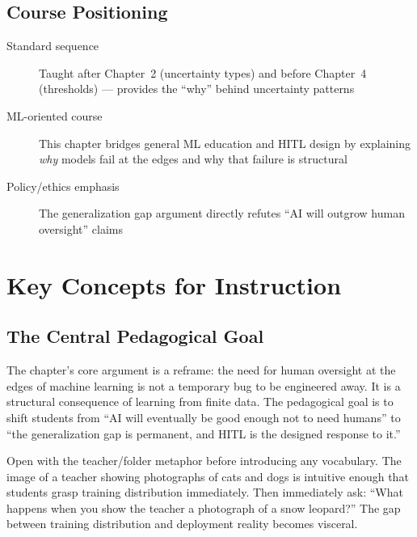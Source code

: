 \subsection{Course Positioning}

\begin{description}
    \item[Standard sequence] Taught after Chapter~2 (uncertainty types) and before Chapter~4 (thresholds) --- provides the ``why'' behind uncertainty patterns
    \item[ML-oriented course] This chapter bridges general ML education and HITL design by explaining \emph{why} models fail at the edges and why that failure is structural
    \item[Policy/ethics emphasis] The generalization gap argument directly refutes ``AI will outgrow human oversight'' claims
\end{description}

\section{Key Concepts for Instruction}

\subsection{The Central Pedagogical Goal}

The chapter's core argument is a reframe: the need for human oversight at the edges of machine learning is not a temporary bug to be engineered away. It is a structural consequence of learning from finite data. The pedagogical goal is to shift students from ``AI will eventually be good enough not to need humans'' to ``the generalization gap is permanent, and HITL is the designed response to it.''

\begin{technote}
Open with the teacher/folder metaphor before introducing any vocabulary. The image of a teacher showing photographs of cats and dogs is intuitive enough that students grasp training distribution immediately. Then immediately ask: ``What happens when you show the teacher a photograph of a snow leopard?'' The gap between training distribution and deployment reality becomes visceral.
\end{technote}

